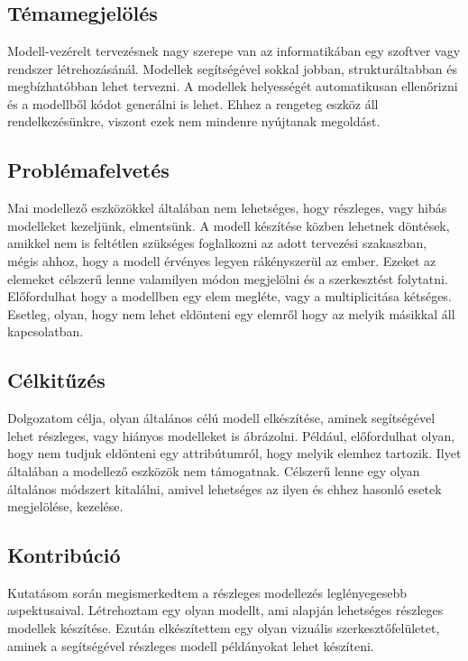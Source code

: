 \chapter{\bevezetes}

\section{Témamegjelölés}
Modell-vezérelt tervezésnek nagy szerepe van az informatikában egy szoftver vagy rendszer létrehozásánál. Modellek segítségével sokkal jobban, strukturáltabban és megbízhatóbban lehet tervezni. A modellek helyességét automatikusan ellenőrizni és a modellből kódot generálni is lehet. Ehhez a rengeteg eszköz áll rendelkezésünkre, viszont ezek nem mindenre nyújtanak megoldást. 
\section{Problémafelvetés}
Mai modellező eszközökkel általában nem lehetséges, hogy részleges, vagy hibás modelleket kezeljünk, elmentsünk. A modell készítése közben lehetnek döntések, amikkel nem is feltétlen szükséges foglalkozni az adott tervezési szakaszban, mégis ahhoz, hogy a modell érvényes legyen rákényszerül az ember. Ezeket az elemeket célszerű lenne valamilyen módon megjelölni és a szerkesztést folytatni. Előfordulhat hogy a modellben egy elem megléte, vagy a multiplicitása kétséges. Esetleg, olyan, hogy nem lehet eldönteni egy elemről hogy az melyik másikkal áll kapcsolatban.
\section{Célkitűzés}	
Dolgozatom célja, olyan általános célú modell elkészítése, aminek segítségével lehet részleges, vagy hiányos modelleket is ábrázolni. Például, előfordulhat olyan, hogy nem tudjuk eldönteni egy attribútumról, hogy melyik elemhez tartozik. Ilyet általában a modellező eszközök nem támogatnak. Célszerű lenne egy olyan általános módszert kitalálni, amivel lehetséges az ilyen és ehhez hasonló esetek megjelölése, kezelése.
\section{Kontribúció}
Kutatásom során megismerkedtem a részleges modellezés leglényegesebb aspektusaival. Létrehoztam egy olyan modellt, ami alapján lehetséges részleges modellek készítése. Ezután elkészítettem egy olyan vizuális szerkesztőfelületet, aminek a segítségével részleges modell példányokat lehet készíteni.  

